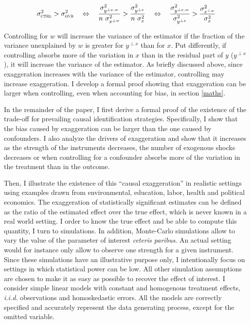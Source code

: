 			\[
				 \sigma_{\textsc{ctrl}}^2 > \sigma_{\textsc{ovb}}^2
				 	\quad \Leftrightarrow \quad 
				 	\dfrac{\sigma^{2}_{y^{\perp x, w}}}{n \ \sigma_{x^{\perp w}}^{2}} >
					\dfrac{\sigma^{2}_{y^{\perp x}}}{n \ \sigma_{x}^{2}} 
					\quad \Leftrightarrow \quad 
					\dfrac{\sigma^{2}_{y^{\perp x, w}}}{ \sigma_{y^{\perp x}}^{2}} >
					\dfrac{\sigma^{2}_{x^{\perp w}}}{\sigma_{x}^{2}}
			\]
			
			Controlling for $w$ will increase the variance of the estimator if the fraction of the variance unexplained by $w$ is greater for $y^{\perp x}$ than for $x$. Put differently, if controlling absorbs more of the variation in $x$ than in the residual part of $y$ ($y^{\perp x}$), it will increase the variance of the estimator. As briefly discussed above, since exaggeration increases with the variance of the estimator, controlling may increase exaggeration. I develop a formal proof showing that exaggeration can be larger when controlling, even when accounting for bias, in section \ref{maths}.
			
			In the remainder of the paper, I first derive a formal proof of the existence of the trade-off for prevailing causal identification strategies. Specifically, I show that the bias caused by exaggeration can be larger than the one caused by confounders. I also analyze the drivers of exaggeration and show that it increases as the strength of the instruments decreases, the number of exogenous shocks decreases or when controlling for a confounder absorbs more of the variation in the treatment than in the outcome. 
			
			 Then, I illustrate the existence of this ``causal exaggeration'' in realistic settings using examples drawn from environmental, education, labor, health and political economics. %
			The exaggeration of statistically significant estimates can be defined as the ratio of the estimated effect over the true effect, which is never known in a real world setting. I order to know the true effect and be able to compute this quantity, I turn to simulations. In addition, Monte-Carlo simulations allow to vary the value of the parameter of interest \textit{ceteris paribus}. An actual setting would for instance only allow to observe one strength for a given instrument. Since these simulations have an illustrative purpose only, I intentionally focus on settings in which statistical power can be low. All other simulation assumptions are chosen to make it as easy as possible to recover the effect of interest. I consider simple linear models with constant and homogenous treatment effects, \textit{i.i.d.} observations and homoskedastic errors. All the models are correctly specified and accurately represent the data generating process, except for the omitted variable.
									
